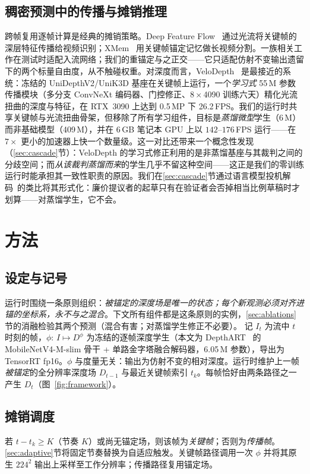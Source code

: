 \documentclass[10pt,twocolumn]{article}
\begin{document}
\subsection{稠密预测中的传播与摊销推理}
跨帧复用逐帧计算是经典的摊销策略。Deep Feature Flow~\cite{dff} 通过光流将关键帧的深层特征传播给视频识别；XMem~\cite{xmem} 用关键帧锚定记忆做长视频分割。一族相关工作在测试时适配入流网络；我们的重锚定与之正交——它只适配仿射不变输出遗留下的两个标量自由度，从不触碰权重。对深度而言，VeloDepth~\cite{velodepth} 是最接近的系统：冻结的 UniDepthV2/UniK3D 基座在关键帧上运行，一个\emph{学习式} 55\,M 参数传播模块（多分支 ConvNeXt 编码器、门控修正、$8\times$4090 训练六天）精化光流扭曲的深度与特征，在 RTX~3090 上达到 0.5\,MP 下 26.2\,FPS。我们的运行时共享关键帧与光流扭曲骨架，但移除了所有学习组件，目标是\emph{蒸馏微型}学生（6\,M）而非基础模型（409\,M），并在 6\,GB 笔记本 GPU 上以 $142$--$176$\,FPS 运行——在 $7\times$ 更小的加速器上快一个数量级。这一对比还带来一个概念性发现（\ref{sec:cascade}节）：VeloDepth 的学习式修正利用的是非蒸馏基座与其裁判之间的分歧空间；而\emph{从该裁判蒸馏而来}的学生几乎不留这种空间——这正是我们的零训练运行时能承担其一致性职责的原因。我们在\ref{sec:cascade}节通过语言模型投机解码~\cite{specdec}的类比将其形式化：廉价提议者的起草只有在验证者会否掉相当比例草稿时才划算——对蒸馏学生，它不会。

\section{方法}
\label{sec:method}

\subsection{设定与记号}
运行时围绕一条原则组织：\emph{被锚定的深度场是唯一的状态；每个新观测必须对齐进锚的坐标系，永不与之混合}。下文所有组件都是这条原则的实例，\ref{sec:ablations}节的消融检验其两个预测（混合有害；对蒸馏学生修正不必要）。
记 $I_t$ 为流中 $t$ 时刻的帧，$\phi:\, I \mapsto D^{\phi}$ 为冻结的逐帧深度学生（本文为 DepthART~\cite{depthart} 的 MobileNetV4-M-slim 骨干 + 单路金字塔融合解码器，6.05\,M 参数），导出为 TensorRT fp16。$\phi$ 与度量无关：输出为仿射不变的相对深度。运行时维护上一帧\emph{被锚定}的全分辨率深度场 $D_{t-1}$ 与最近关键帧索引 $t_k$。每帧恰好由两条路径之一产生 $D_t$（图~\ref{fig:framework}）。

\subsection{摊销调度}
若 $t - t_k \geq K$（节奏 $K$）或尚无锚定场，则该帧为\emph{关键帧}；否则为\emph{传播帧}。\ref{sec:adaptive}节将固定节奏替换为自适应触发。关键帧路径调用一次 $\phi$ 并将其原生 $224^2$ 输出上采样至工作分辨率；传播路径复用锚定场。
\end{document}
